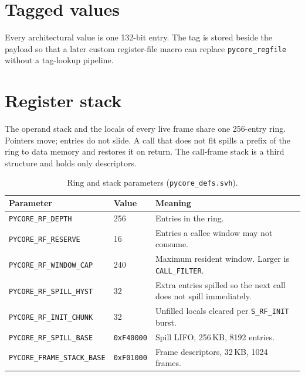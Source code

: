 \documentclass[11pt,a4paper]{article}
\begin{document}


\section{Tagged values}
\label{sec:tags}

Every architectural value is one 132-bit entry.
The tag is stored beside the payload so that a later custom register-file
macro can replace \texttt{pycore\_regfile} without a tag-lookup pipeline.



\section{Register stack}
\label{sec:rf}

The operand stack and the locals of every live frame share one 256-entry
ring.
Pointers move; entries do not slide.
A call that does not fit spills a prefix of the ring to data memory and
restores it on return.
The call-frame stack is a third structure and holds only descriptors.



\begin{table}[htbp]
\centering
\caption{Ring and stack parameters (\texttt{pycore\_defs.svh}).}
\label{tab:rf}
\small
\begin{tabular}{@{}llp{}@{}}
\toprule
Parameter & Value & Meaning \\
\midrule
\texttt{PYCORE\_RF\_DEPTH} & 256 & Entries in the ring. \\
\texttt{PYCORE\_RF\_RESERVE} & 16 & Entries a callee window may not consume. \\
\texttt{PYCORE\_RF\_WINDOW\_CAP} & 240 & Maximum resident window. Larger is \texttt{CALL\_FILTER}. \\
\texttt{PYCORE\_RF\_SPILL\_HYST} & 32 & Extra entries spilled so the next call does not spill immediately. \\
\texttt{PYCORE\_RF\_INIT\_CHUNK} & 32 & Unfilled locals cleared per \texttt{S\_RF\_INIT} burst. \\
\texttt{PYCORE\_RF\_SPILL\_BASE} & \texttt{0xF40000} & Spill LIFO, 256\,KB, 8192 entries. \\
\texttt{PYCORE\_FRAME\_STACK\_BASE} & \texttt{0xF01000} & Frame descriptors, 32\,KB, 1024 frames. \\
\bottomrule
\end{tabular}
\end{table}
\end{document}
